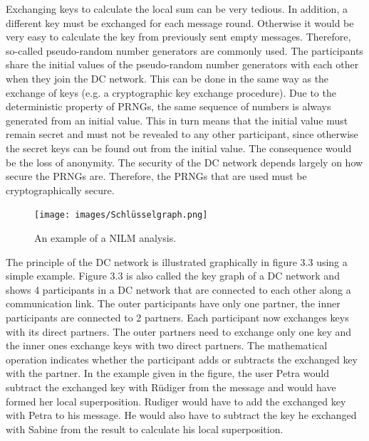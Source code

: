Exchanging keys to calculate the local sum can be very tedious. In addition, a different key must be exchanged for each message round. Otherwise it would be very easy to calculate the key from previously sent empty messages. Therefore, so-called pseudo-random number generators are commonly used. The participants share the initial values of the pseudo-random number generators with each other when they join the DC network. This can be done in the same way as the exchange of keys (e.g. a cryptographic key exchange procedure). Due to the deterministic property of PRNGs, the same sequence of numbers is always generated from an initial value. This in turn means that the initial value must remain secret and must not be revealed to any other participant, since otherwise the secret keys can be found out from the initial value. The consequence would be the loss of anonymity. The security of the DC network depends largely on how secure the PRNGs are. Therefore, the PRNGs that are used must be cryptographically secure.\\
\begin{figure}[tbp]
  \centering
  \texttt{[image: images/Schlüsselgraph.png]}
  \caption[Short description]{An example of a NILM analysis.}
  \label{fig:Appliance_Model}
\end{figure}
The principle of the DC network is illustrated graphically in figure 3.3 using a simple example. Figure 3.3 is also called the key graph of a DC network and shows 4 participants in a DC network that are connected to each other along a communication link. The outer participants have only one partner, the inner participants are connected to 2 partners. Each participant now exchanges keys with its direct partners. The outer partners need to exchange only one key and the inner ones exchange keys with two direct partners.
The mathematical operation indicates whether the participant adds or subtracts the exchanged key with the partner. In the example given in the figure, the user Petra would subtract the exchanged key with Rüdiger from the message and would have formed her local superposition. Rudiger would have to add the exchanged key with Petra to his message. He would also have to subtract the key he exchanged with Sabine from the result to calculate his local superposition. 

